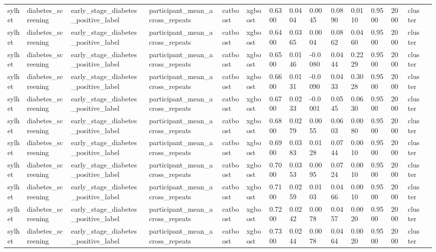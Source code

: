 \begin{tabular}{lllllllllllllll}
sylhet & diabetes\_screening & early\_stage\_diabetes\_positive\_label & participant\_mean\_across\_repeats & catboost & xgboost & 0.6300 & 0.0404 & 0.0045 & 0.0890 & 0.0110 & 0.9500 & 2000 & cluster &  \\
sylhet & diabetes\_screening & early\_stage\_diabetes\_positive\_label & participant\_mean\_across\_repeats & catboost & xgboost & 0.6400 & 0.0365 & 0.0004 & 0.0862 & 0.0460 & 0.9500 & 2000 & cluster &  \\
sylhet & diabetes\_screening & early\_stage\_diabetes\_positive\_label & participant\_mean\_across\_repeats & catboost & xgboost & 0.6500 & 0.0146 & -0.0080 & 0.0444 & 0.2229 & 0.9500 & 2000 & cluster &  \\
sylhet & diabetes\_screening & early\_stage\_diabetes\_positive\_label & participant\_mean\_across\_repeats & catboost & xgboost & 0.6600 & 0.0131 & -0.0090 & 0.0433 & 0.3028 & 0.9500 & 2000 & cluster &  \\
sylhet & diabetes\_screening & early\_stage\_diabetes\_positive\_label & participant\_mean\_across\_repeats & catboost & xgboost & 0.6700 & 0.0233 & -0.0001 & 0.0545 & 0.0630 & 0.9500 & 2000 & cluster &  \\
sylhet & diabetes\_screening & early\_stage\_diabetes\_positive\_label & participant\_mean\_across\_repeats & catboost & xgboost & 0.6800 & 0.0279 & 0.0055 & 0.0603 & 0.0080 & 0.9500 & 2000 & cluster &  \\
sylhet & diabetes\_screening & early\_stage\_diabetes\_positive\_label & participant\_mean\_across\_repeats & catboost & xgboost & 0.6900 & 0.0383 & 0.0128 & 0.0744 & 0.0010 & 0.9500 & 2000 & cluster &  \\
sylhet & diabetes\_screening & early\_stage\_diabetes\_positive\_label & participant\_mean\_across\_repeats & catboost & xgboost & 0.7000 & 0.0353 & 0.0095 & 0.0724 & 0.0010 & 0.9500 & 2000 & cluster &  \\
sylhet & diabetes\_screening & early\_stage\_diabetes\_positive\_label & participant\_mean\_across\_repeats & catboost & xgboost & 0.7100 & 0.0259 & 0.0103 & 0.0466 & 0.0010 & 0.9500 & 2000 & cluster &  \\
sylhet & diabetes\_screening & early\_stage\_diabetes\_positive\_label & participant\_mean\_across\_repeats & catboost & xgboost & 0.7200 & 0.0242 & 0.0078 & 0.0457 & 0.0020 & 0.9500 & 2000 & cluster &  \\
sylhet & diabetes\_screening & early\_stage\_diabetes\_positive\_label & participant\_mean\_across\_repeats & catboost & xgboost & 0.7300 & 0.0244 & 0.0078 & 0.0464 & 0.0020 & 0.9500 & 2000 & cluster &  \\

\end{tabular}
